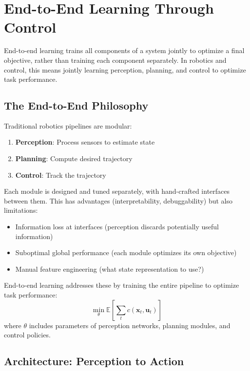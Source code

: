 \section{End-to-End Learning Through Control}
\label{sec:e2e_learning}

End-to-end learning trains all components of a system jointly to optimize a final objective, rather than training each component separately. In robotics and control, this means jointly learning perception, planning, and control to optimize task performance.

\subsection{The End-to-End Philosophy}

Traditional robotics pipelines are modular:
\begin{enumerate}
    \item \textbf{Perception}: Process sensors to estimate state
    \item \textbf{Planning}: Compute desired trajectory
    \item \textbf{Control}: Track the trajectory
\end{enumerate}

Each module is designed and tuned separately, with hand-crafted interfaces between them. This has advantages (interpretability, debuggability) but also limitations:
\begin{itemize}
    \item Information loss at interfaces (perception discards potentially useful information)
    \item Suboptimal global performance (each module optimizes its own objective)
    \item Manual feature engineering (what state representation to use?)
\end{itemize}

End-to-end learning addresses these by training the entire pipeline to optimize task performance:
\begin{equation}
\min_{\theta} \mathbb{E}\left[ \sum_t c(\mathbf{x}_t, \mathbf{u}_t) \right]
\end{equation}
where $\theta$ includes parameters of perception networks, planning modules, and control policies.

\subsection{Architecture: Perception to Action}

